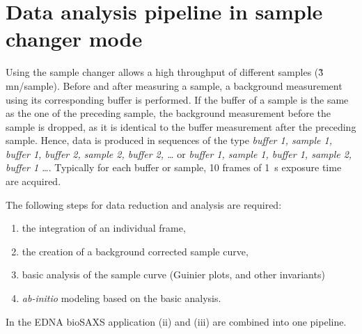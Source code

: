 \documentclass[preprint,pdf]{iucr}              %
\begin{document}
\section{Data analysis pipeline in sample changer mode}

Using the sample changer allows a high throughput of different samples (\~3
mn/sample).
Before and after measuring a sample, a background measurement using its
corresponding buffer is performed.
If the buffer of a sample is the same as the one of the preceding sample, the
background measurement before the sample is dropped, as it is identical to the
buffer measurement after the preceding sample.
Hence, data is produced in sequences of the type \textit{buffer 1, sample 1,
buffer 1, buffer 2, sample 2, buffer 2, \ldots}  or  \textit{buffer 1, sample 1,
buffer 1,  sample 2, buffer 1 \ldots}.
Typically for each buffer or sample, 10 frames of 1~s exposure time are acquired.

The following steps for data reduction and analysis are required:
\begin{enumerate}
\item the integration of an individual frame,
\item the creation of a background corrected sample curve,
\item basic analysis of the sample curve (Guinier plots, and other invariants)
\item \textit{ab-initio} modeling based on the basic analysis.
\end{enumerate}
In the EDNA bioSAXS application (ii) and (iii) are combined into one pipeline.
\end{document}
